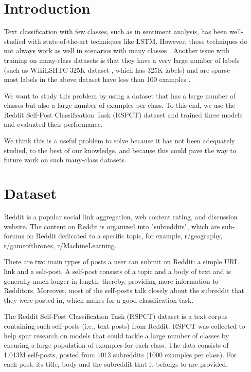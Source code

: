 \documentclass{sig-alternate-05-2015}
\begin{document}


\section{Introduction}

Text classification with few classes, such as in sentiment analysis, has been well-studied \cite{sentiment-analysis} with state-of-the-art techniques like LSTM. However, those techniques do not always work as well in scenarios with many classes \cite{many-classes}. Another issue with training on many-class datasets is that they have a very large number of labels (such as WikiLSHTC-325K dataset \cite{partalas2015lshtc}, which has 325K labels) and are sparse - most labels in the above dataset have less than 100 examples \cite{jonesreddit}.

We want to study this problem by using a dataset that has a large number of classes but also a large number of examples per class. To this end, we use the Reddit Self-Post Classification Task (RSPCT) dataset and trained three models and evaluated their performance.

We think this is a useful problem to solve because it has not been adequately studied, to the best of our knowledge, and because this could pave the way to future work on such many-class datasets.

\section{Dataset}

Reddit is a popular social link aggregation, web content rating, and discussion website. The content on Reddit is organized into "subreddits", which are sub-forums on Reddit dedicated to a specific topic, for example, r/geography, r/gameofthrones, r/MachineLearning.

There are two main types of posts a user can submit on Reddit: a simple URL link and a self-post. A self-post consists of a topic and a body of text and is generally much longer in length, thereby, providing more information to Redditors. Moreover, most of the self-posts talk closely about the subreddit that they were posted in, which makes for a good classification task.

The Reddit Self-Post Classification Task (RSPCT) dataset \cite{kaggle:dataset} is a text corpus containing such self-posts (i.e., text posts) from Reddit. RSPCT was collected to help spur research on models that could tackle a large number of classes by ensuring a large population of examples for each class. The data consists of 1.013M self-posts, posted from 1013 subreddits (1000 examples per class). For each post, its title, body and the subreddit that it belongs to are provided.
\end{document}

